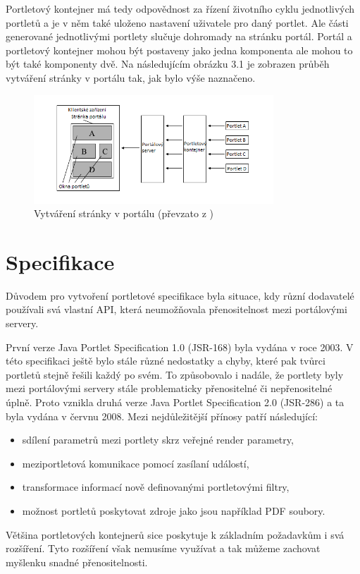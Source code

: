\documentclass{fithesis}
\begin{document}
Portletový kontejner má tedy odpovědnost za řízení životního cyklu jednotlivých portletů a je v něm také uloženo nastavení uživatele pro daný portlet. Ale části generované jednotlivými portlety slučuje dohromady na stránku portál. Portál a portletový kontejner mohou být postaveny jako jedna komponenta ale mohou to být také komponenty dvě. Na následujícím obrázku 3.1 je zobrazen průběh vytváření stránky v portálu tak, jak bylo výše naznačeno.

\begin{figure}[htp]
\centering
\includegraphics[width=340px]{images/vytvareni_stranky_v_portalu.png}
\caption{Vytváření stránky v portálu (převzato z \cite{jsr-286})}
\end{figure}

\section{Specifikace}
Důvodem pro vytvoření portletové specifikace byla situace, kdy různí dodavatelé používali svá vlastní API, která neumožňovala přenositelnost mezi portálovými servery.

První verze Java Portlet Specification 1.0 (JSR-168) byla vydána v roce 2003. V této specifikaci ještě bylo stále různé nedostatky a chyby, které pak tvůrci portletů stejně řešili každý po svém. To způsobovalo i nadále, že portlety byly mezi portálovými servery stále problematicky přenositelné či nepřenositelné úplně. Proto vznikla druhá verze Java Portlet Specification 2.0 (JSR-286) a ta byla vydána v červnu 2008. Mezi nejdůležitější přínosy patří následující:
\begin{itemize}
\item sdílení parametrů mezi portlety skrz veřejné render parametry,
\item meziportletová komunikace pomocí zasílaní událostí,
\item transformace informací nově definovanými portletovými filtry,
\item možnost portletů poskytovat zdroje jako jsou například PDF soubory.
\end{itemize}
Většina portletových kontejnerů sice poskytuje k základním požadavkům i svá rozšíření. Tyto rozšíření však nemusíme využívat a tak můžeme zachovat myšlenku snadné přenositelnosti.
\end{document}
